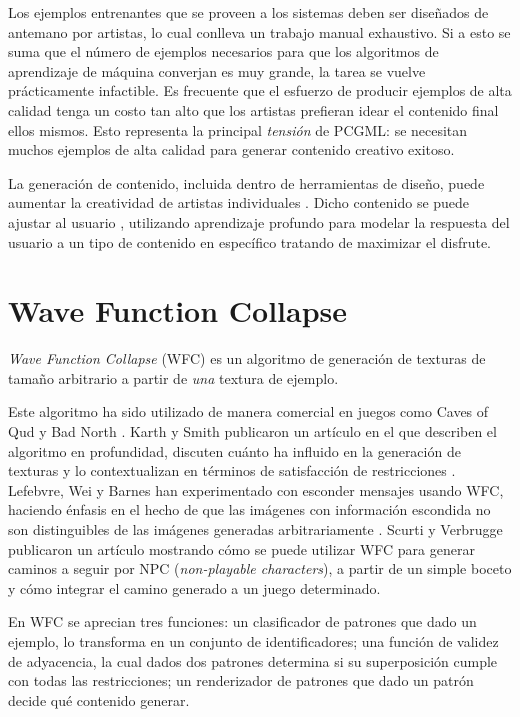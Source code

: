 Los ejemplos entrenantes que se proveen
a los sistemas deben ser diseñados de antemano por artistas, lo cual
conlleva un trabajo manual exhaustivo. Si a esto se suma que el número
de ejemplos necesarios para que los algoritmos de aprendizaje de máquina
converjan es muy grande, la tarea se vuelve prácticamente infactible.
Es frecuente que el esfuerzo de producir ejemplos de alta calidad
tenga un costo tan alto que los artistas prefieran idear
el contenido final ellos mismos. Esto representa la principal
\textit{tensión} de PCGML: se necesitan muchos ejemplos de alta calidad
para generar contenido creativo exitoso.

La generación de contenido, incluida dentro de herramientas de diseño,
puede aumentar la creatividad de artistas individuales \cite{bib:4}.
Dicho contenido se puede ajustar al usuario
\cite{bib:7}, utilizando aprendizaje profundo para modelar la respuesta
del usuario a un tipo de contenido en específico tratando de maximizar
el disfrute.

\section*{Wave Function Collapse}

\textit{Wave Function Collapse} (WFC) \cite{bib:16}
es un algoritmo de generación de texturas de tamaño arbitrario
a partir de \textit{una} textura de ejemplo.

Este algoritmo ha sido utilizado de manera comercial en juegos
como Caves of Qud \cite{bib:17} y Bad North \cite{bib:18}. Karth y Smith 
publicaron un artículo en el que describen el algoritmo en profundidad,
discuten cuánto ha influido en la generación de texturas y lo
contextualizan en términos de satisfacción de restricciones \cite{bib:2}.
Lefebvre, Wei y Barnes han experimentado con esconder mensajes
usando WFC, haciendo énfasis en el hecho de que las imágenes
con información escondida no son distinguibles de las imágenes
generadas arbitrariamente \cite{bib:14}. Scurti y Verbrugge
publicaron un artículo mostrando cómo se puede utilizar
WFC para generar caminos a seguir por NPC (\textit{non-playable characters}),
a partir de un simple boceto y cómo integrar el camino generado a
un juego determinado.

En WFC se aprecian tres funciones: un clasificador de patrones 
que dado un ejemplo, lo transforma en un conjunto de identificadores;
una función de validez de adyacencia, la cual dados dos patrones determina
si su superposición cumple con todas las restricciones; un 
renderizador de patrones que dado un patrón decide qué contenido generar.

